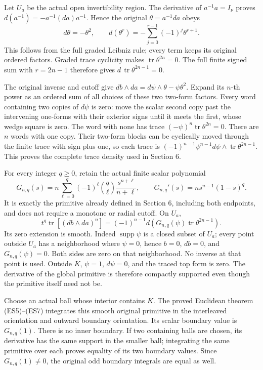 \documentclass[
  11pt,
]{article}
\begin{document}
Let \(U_a\) be the actual open invertibility region. The derivative of
\(a^{-1}a=I_\nu\) proves \(d(a^{-1})=-a^{-1}(da)a^{-1}\). Hence the
original \(\theta=a^{-1}da\) obeys \[
d\theta=-\theta^2,\qquad
d(\theta^r)=-\sum_{j=0}^{r-1}(-1)^j\theta^{r+1}.
\tag{OE13}
\] This follows from the full graded Leibniz rule; every term keeps its
original ordered factors. Graded trace cyclicity makes
\(\operatorname{tr}\theta^{2n}=0\). The full finite signed sum with
\(r=2n-1\) therefore gives \(d\,\operatorname{tr}\theta^{2n-1}=0\).

The original inverse and cutoff give
\(db\wedge da=d\psi\wedge\theta-\psi\theta^2\). Expand its \(n\)-th
power as an ordered sum of all choices of these two two-form factors.
Every word containing two copies of \(d\psi\) is zero: move the scalar
second copy past the intervening one-forms with their exterior signs
until it meets the first, whose wedge square is zero. The word with none
has trace \((-\psi)^n\operatorname{tr}\theta^{2n}=0\). There are \(n\)
words with one copy. Their two-form blocks can be cyclically moved
through the finite trace with sign plus one, so each trace is
\((-1)^{n-1}\psi^{n-1}d\psi\wedge\operatorname{tr}\theta^{2n-1}\). This
proves the complete trace density used in Section 6.

For every integer \(q\geq0\), retain the actual finite scalar polynomial
\[
G_{n,q}(s)
 =n\sum_{\ell=0}^{q}(-1)^\ell\binom q\ell
                        \frac{s^{n+\ell}}{n+\ell},
\qquad
G_{n,q}'(s)=ns^{n-1}(1-s)^q.
\tag{OE14}
\] It is exactly the primitive already defined in Section 6, including
both endpoints, and does not require a monotone or radial cutoff. On
\(U_a\), \[
t^q\operatorname{tr}[(db\wedge da)^n]
 =(-1)^{n-1}
         d\!\left(G_{n,q}(\psi)\operatorname{tr}\theta^{2n-1}\right).
\tag{OE15}
\] Its zero extension is smooth. Indeed \(\operatorname{supp}\psi\) is a
closed subset of \(U_a\); every point outside \(U_a\) has a neighborhood
where \(\psi=0\), hence \(b=0\), \(db=0\), and \(G_{n,q}(\psi)=0\). Both
sides are zero on that neighborhood. No inverse at that point is used.
Outside \(K\), \(\psi=1\), \(d\psi=0\), and the traced top form is zero.
The derivative of the global primitive is therefore compactly supported
even though the primitive itself need not be.

Choose an actual ball whose interior contains \(K\). The proved
Euclidean theorem (ES5)--(ES7) integrates this smooth original primitive
in the interleaved orientation and outward boundary orientation. Its
scalar boundary value is \(G_{n,q}(1)\). There is no inner boundary. If
two containing balls are chosen, its derivative has the same support in
the smaller ball; integrating the same primitive over each proves
equality of its two boundary values. Since \(G_{n,q}(1)\ne0\), the
original odd boundary integrals are equal as well.
\end{document}
